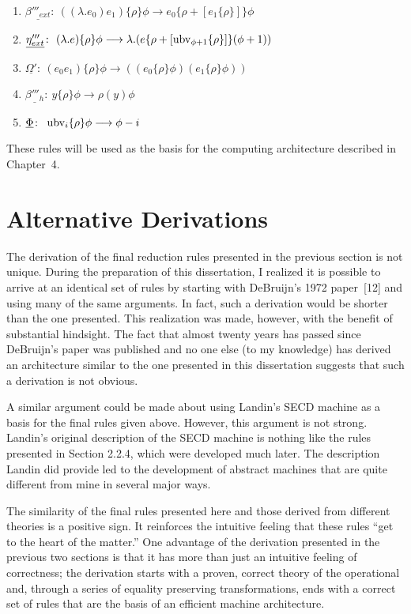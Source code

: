 \begin{enumerate}
\item \(\underline{\beta'''_{ext}}\colon\ ((\lambda.e_0)e_1)\{\rho\}\phi
\longrightarrow e_0\{\rho+[e_1\{\rho\}]\}\phi\)
\item \(\underline{\eta'''_{ext}}\colon\ (\lambda.e)\{\rho\}\phi\longrightarrow
\lambda.(e\{\rho+[\ubv_{\phi+1}\{\rho\}]\}(\phi+1))\)
\item \(\underline{\Omega'}\colon\ (e_0e_1)\{\rho\}\phi
\longrightarrow ((e_0\{\rho\}\phi)(e_1\{\rho\}\phi))\)
\item \(\underline{\beta'''_h}\colon\  y\{\rho\}\phi\longrightarrow\rho(y)\phi\)
\item \(\underline{\Phi}\colon\ \ubv_i\{\rho\}\phi\longrightarrow\phi-i\)
\end{enumerate}

These rules will be used as the basis for the computing architecture described
in Chapter~4.

\section{Alternative Derivations}

The derivation of the final reduction rules presented in the previous section
is not unique. During the preparation of this dissertation, I realized it is
possible to arrive at an identical set of rules by starting with DeBruijn's 1972
paper~[12] and using many of the same arguments. In fact, such a derivation
would be shorter than the one presented. This realization was made, however,
with the benefit of substantial hindsight. The fact that almost twenty years has
passed since DeBruijn's paper was published and no one else (to my knowledge)
has derived an architecture similar to the one presented in this dissertation
suggests that such a derivation is not obvious.

A similar argument could be made about using Landin's SECD machine as a basis
for the final rules given above. However, this argument is not strong. Landin's
original description of the SECD machine is nothing like the rules presented in
Section 2.2.4, which were developed much later. The description Landin did
provide led to the development of abstract machines that are quite different
from mine in several major ways.

The similarity of the final rules presented here and those derived from
different theories is a positive sign. It reinforces the intuitive feeling that
these rules ``get to the heart of the matter.'' One advantage of the derivation
presented in the previous two sections is that it has more than just an
intuitive feeling of correctness; the derivation starts with a proven, correct
theory of the operational \lambdacalculus{} and, through a series of equality
preserving transformations, ends with a correct set of rules that are the basis
of an efficient machine architecture.
